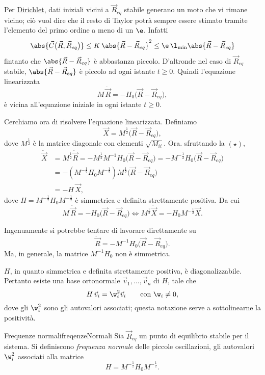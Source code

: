 Per \hyperref[th:teoremaDirichlet]{Dirichlet}, dati iniziali vicini a \(\vec{R}_{eq}\) stabile generano un moto che vi rimane vicino; ciò vuol dire che il resto di Taylor potrà sempre essere stimato tramite l'elemento del primo ordine a meno di un \(\e\). Infatti
\[
	\abs{\vec{C}\big(\vec{R},\vec{R}_{eq}\big)} \le K\,\abs{\vec{R}-\vec{R}_{eq}}^2 \le \e\,\l_{\min}\abs{\vec{R}-\vec{R}_{eq}}
\]
fintanto che \(\abs{\vec{R}-\vec{R}_{eq}}\) è abbastanza piccolo.
D'altronde nel caso di \(\vec{R}_{eq}\) stabile, \(\abs{\vec{R}-\vec{R}_{eq}}\) è piccolo ad ogni istante \(t\ge 0\).
Quindi l'equazione linearizzata
\[
	M\,\ddot{\vec{R}} = -H_0\big(\vec{R}-\vec{R}_{eq}\big),\tag{\(\star\)}
\]
è vicina all'equazione iniziale in ogni istante \(t\ge 0\).

Cerchiamo ora di risolvere l'equazione linearizzata.
Definiamo
\[
	\vec{X} = M^{\frac{1}{2}}\big(\vec{R}-\vec{R}_{eq}\big),
\]
dove \(M^{\frac{1}{2}}\) è la matrice diagonale con elementi \(\sqrt{M_{ii}}\).
Ora. sfruttando la \((\star)\),
\[
	\begin{split}
		\ddot{\vec{X}} & = M^{\frac{1}{2}}\ddot{\vec{R}} = -M^{\frac{1}{2}}M^{-1}H_0\big(\vec{R}-\vec{R}_{eq}\big) = -M^{-\frac{1}{2}}H_0\big(\vec{R}-\vec{R}_{eq}\big)\\
		& = -(M^{-\frac{1}{2}}H_0 M^{-\frac{1}{2}}) M^{\frac{1}{2}}\big(\vec{R}-\vec{R}_{eq}\big)\\
		& = -H\,\vec{X},
	\end{split}
\]
dove \(H=M^{-\frac{1}{2}}H_0 M^{-\frac{1}{2}}\) è simmetrica e definita strettamente positiva. Da cui
\[
	M\,\ddot{\vec{R}} = -H_0 \big(\vec{R}-\vec{R}_{eq}\big) \iff M^{\frac{1}{2}}\ddot{\vec{X}} = -H_0 M^{-\frac{1}{2}} \vec{X}.
\]

\begin{oss}
	Ingenuamente si potrebbe tentare di lavorare direttamente su
	\[
		\ddot{\vec{R}} = -M^{-1}H_0\big(\vec{R}-\vec{R}_{eq}\big).
	\]
	Ma, in generale, la matrice \(M^{-1} H_0\) non è simmetrica.
\end{oss}
\noindent
\(H\), in quanto simmetrica e definita strettamente positiva, è diagonalizzabile.
Pertanto esiste una base ortonormale \(\vec{v}_1,\ldots,\vec{v}_n\) di \(H\), tale che
\[
	H\,\vec{v}_i = \w_i^2 \vec{v}_i \qquad\text{con }\w_i \neq 0,
\]
dove gli \(\w_i^2\) sono gli autovalori associati; questa notazione serve a sottolinearne la positività.

\begin{defn}{Frequenze normali}{freqenzeNormali}
	Sia \(\vec{R}_{eq}\) un punto di equilibrio stabile per il sistema.
	Si definiscono \emph{frequenza normale} delle piccole oscillazioni, gli autovalori \(\w_i^2\) associati alla matrice
	\[
		H=M^{-\frac{1}{2}}H_0 M^{-\frac{1}{2}}. 
	\]
\end{defn}

